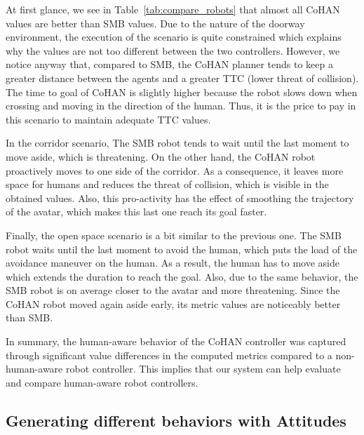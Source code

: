 At first glance, we see in Table~\ref{tab:compare_robots} that almost all CoHAN values are better than SMB values. Due to the nature of the doorway environment, the execution of the scenario is quite constrained which explains why the values are not too different between the two controllers. However, we notice anyway that, compared to SMB, the CoHAN planner tends to keep a greater distance between the agents and a greater TTC (lower threat of collision). The time to goal of CoHAN is slightly higher because the robot slows down when crossing and moving in the direction of the human. Thus, it is the price to pay in this scenario to maintain adequate TTC values.

In the corridor scenario, The SMB robot tends to wait until the last moment to move aside, which is threatening. On the other hand, the CoHAN robot proactively moves to one side of the corridor. As a consequence, it leaves more space for humans and reduces the threat of collision, which is visible in the obtained values. Also, this pro-activity has the effect of smoothing the trajectory of the avatar, which makes this last one reach its goal faster.

Finally, the open space scenario is a bit similar to the previous one. The SMB robot waits until the last moment to avoid the human, which puts the load of the avoidance maneuver on the human. As a result, 
the human has to move aside which extends the duration to reach the goal. Also, due to the same behavior, the SMB robot is on average closer to the avatar and more threatening. Since the CoHAN robot moved again aside early, its metric values are noticeably better than SMB.

In summary, the human-aware behavior of the CoHAN controller was captured through significant value differences in the computed metrics compared to a non-human-aware robot controller. This implies that our system can help evaluate and compare human-aware robot controllers.

\subsection{Generating different behaviors with Attitudes}

